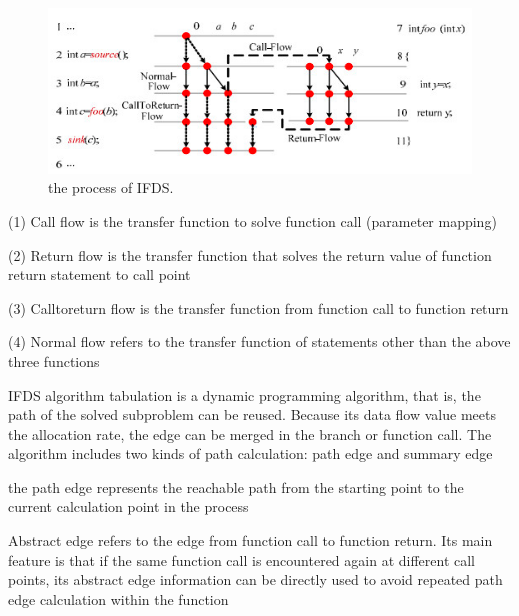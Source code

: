 \documentclass{article}
\begin{document}
\begin{figure}[ht]
  \centering
  \includegraphics[scale=0.4]{IFDS.png}
  \caption{the process of IFDS.}
  \label{fig:IFDS}
\end{figure}
(1) Call flow is the transfer function to solve function call (parameter mapping)

(2) Return flow is the transfer function that solves the return value of function return statement to call point

(3) Calltoreturn flow is the transfer function from function call to function return

(4) Normal flow refers to the transfer function of statements other than the above three functions

IFDS algorithm tabulation is a dynamic programming algorithm, that is, the path of the solved subproblem can be reused. Because its data flow value meets the allocation rate, the edge can be merged in the branch or function call. The algorithm includes two kinds of path calculation: path edge and summary edge

the path edge represents the reachable path from the starting point to the current calculation point in the process

Abstract edge refers to the edge from function call to function return. Its main feature is that if the same function call is encountered again at different call points, its abstract edge information can be directly used to avoid repeated path edge calculation within the function
\end{document}
